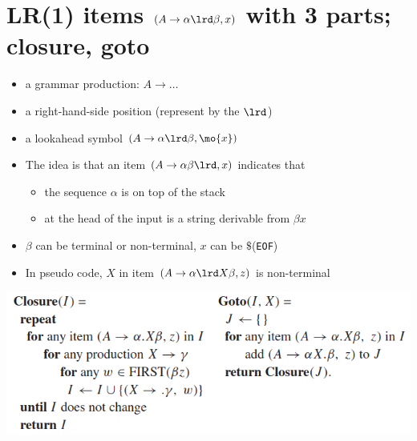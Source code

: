 \section*{LR(1) items $(A\to \alpha\lrd\beta, x)$ with 3 parts; closure, goto}
\begin{itemize}
\item a grammar production: $A\to\ldots$
\item a right-hand-side position (represent by the  $\lrd$)
\item a lookahead symbol $(A\to \alpha\lrd\beta, \mo{x})$
\item The idea is that an item $(A\to\alpha\beta\lrd,x)$ indicates that
  \begin{itemize}
  \item the sequence $\alpha$ is on top of the stack
  \item at the head of the input is a string derivable from $\beta x$
  \end{itemize}
\item $\beta$ can be terminal or non-terminal, $x$ can be $\$$(\texttt{EOF})
\item In pseudo code, $X$ in item $(A\to \alpha\lrd X\beta, z)$ is non-terminal
\end{itemize}
\includegraphics*[width=\linewidth]{img/LR1_closure_goto}
